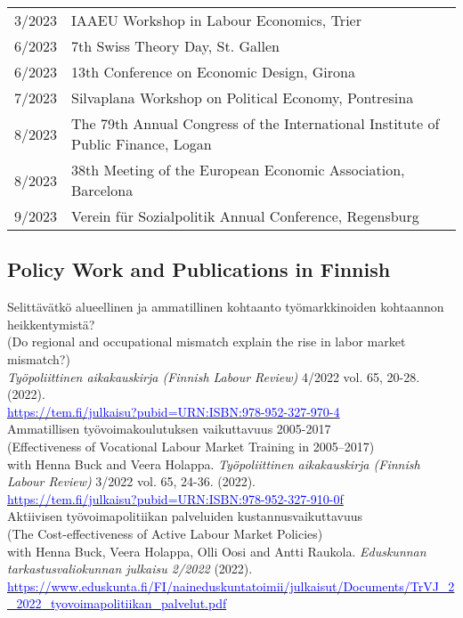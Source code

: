 \documentclass[16pt]{article}
\begin{document}
\begin{tabular}{@{}p{0.5in}p{6in}}
3/2023             & IAAEU Workshop in Labour Economics, Trier \\
6/2023             & 7th Swiss Theory Day, St. Gallen \\
6/2023             & 13th Conference on Economic Design, Girona \\
7/2023             & Silvaplana Workshop on Political Economy, Pontresina \\
8/2023             & The 79th Annual Congress of the International Institute of Public Finance, Logan \\
8/2023             & 38th Meeting of the European Economic Association, Barcelona \\
9/2023             & Verein für Sozialpolitik Annual Conference, Regensburg
\end{tabular}







\subsection*{Policy Work and Publications in Finnish}

\noindent Selittävätkö alueellinen ja ammatillinen kohtaanto työmarkkinoiden kohtaannon heikkentymistä?\\
\noindent (Do regional and occupational mismatch explain the rise in labor market mismatch?) \\
\noindent \textit{Työpoliittinen aikakauskirja (Finnish Labour Review)} 4/2022 vol. 65, 20-28.  (2022). \\
\noindent \href{https://tem.fi/julkaisu?pubid=URN:ISBN:978-952-327-970-4}{\textcolor{blue}{https://tem.fi/julkaisu?pubid=URN:ISBN:978-952-327-970-4}} \\

\noindent Ammatillisen työvoimakoulutuksen vaikuttavuus 2005-2017 \\
\noindent (Effectiveness of Vocational Labour Market Training in 2005–2017) \\
\noindent  with Henna Buck and Veera Holappa. \textit{Työpoliittinen aikakauskirja (Finnish Labour Review)} 3/2022 vol. 65, 24-36.  (2022).  \\
\noindent \href{https://tem.fi/julkaisu?pubid=URN:ISBN:978-952-327-910-0}{\textcolor{blue}{https://tem.fi/julkaisu?pubid=URN:ISBN:978-952-327-910-0f}} \\

\noindent Aktiivisen työvoimapolitiikan palveluiden kustannusvaikuttavuus \\
\noindent (The Cost-effectiveness of Active Labour Market Policies) \\
\noindent with Henna Buck, Veera Holappa, Olli Oosi and Antti Raukola. \textit{Eduskunnan tarkastusvaliokunnan julkaisu 2/2022} (2022). \\
\noindent  \href{https://www.eduskunta.fi/FI/naineduskuntatoimii/julkaisut/Documents/TrVJ\_2\_2022\_tyovoimapolitiikan\_palvelut.pdf}{\textcolor{blue}{https://www.eduskunta.fi/FI/naineduskuntatoimii/julkaisut/Documents/TrVJ\_2\_2022\_tyovoimapolitiikan\_palvelut.pdf}} \\
\end{document}
